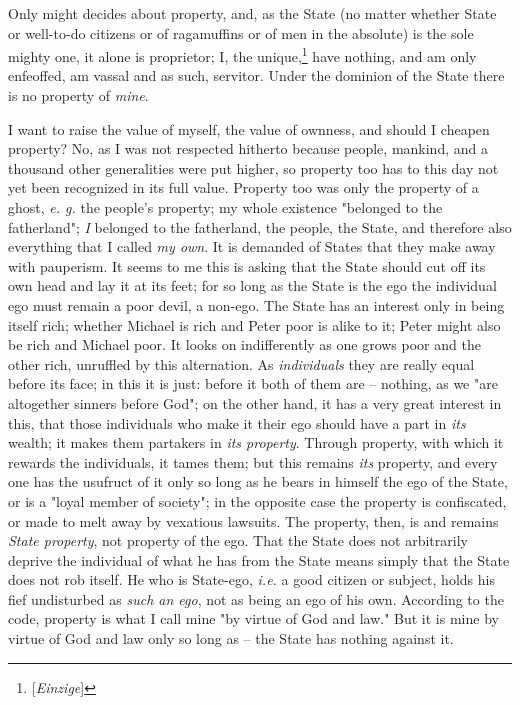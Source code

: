 \documentclass[a4paper]{book}
\begin{document}
Only might decides about property, and, as the State (no matter whether State 
or well-to-do citizens or of ragamuffins or of men in the absolute) is the 
sole mighty one, it alone is proprietor; I, the 
unique,\footnote{[\textit{Einzige}]} have nothing, and am only enfeoffed, am 
vassal and as such, servitor. Under the dominion of the State there is no 
property of \textit{mine}.

I want to raise the value of myself, the value of ownness, and should I 
cheapen property? No, as I was not respected hitherto because people, mankind, 
and a thousand other generalities were put higher, so property too has to this 
day not yet been recognized in its full value. Property too was only the 
property of a ghost, \textit{e. g.} the people's property; my whole existence 
"{}belonged to the fatherland"{}; \textit{I} belonged to the fatherland, the 
people, the State, and therefore also everything that I called \textit{my 
own}. It is demanded of States that they make away with pauperism. It seems to 
me this is asking that the State should cut off its own head and lay it at its 
feet; for so long as the State is the ego the individual ego must remain a 
poor devil, a non-ego. The State has an interest only in being itself rich; 
whether Michael is rich and Peter poor is alike to it; Peter might also be 
rich and Michael poor. It looks on indifferently as one grows poor and the 
other rich, unruffled by this alternation. As \textit{individuals} they are 
really equal before its face; in this it is just: before it both of them are 
-- nothing, as we "{}are altogether sinners before God"{}; on the other hand, 
it has a very great interest in this, that those individuals who make it their 
ego should have a part in \textit{its} wealth; it makes them partakers in 
\textit{its property}. Through property, with which it rewards the 
individuals, it tames them; but this remains \textit{its} property, and every 
one has the usufruct of it only so long as he bears in himself the ego of the 
State, or is a "{}loyal member of society"{}; in the opposite case the 
property is confiscated, or made to melt away by vexatious lawsuits. The 
property, then, is and remains \textit{State property}, not property of the 
ego. That the State does not arbitrarily deprive the individual of what he has 
from the State means simply that the State does not rob itself. He who is 
State-ego, \textit{i.e.} a good citizen or subject, holds his fief undisturbed 
as \textit{such an ego}, not as being an ego of his own. According to the 
code, property is what I call mine "{}by virtue of God and law."{} But it is 
mine by virtue of God and law only so long as -- the State has nothing against 
it.
\end{document}
